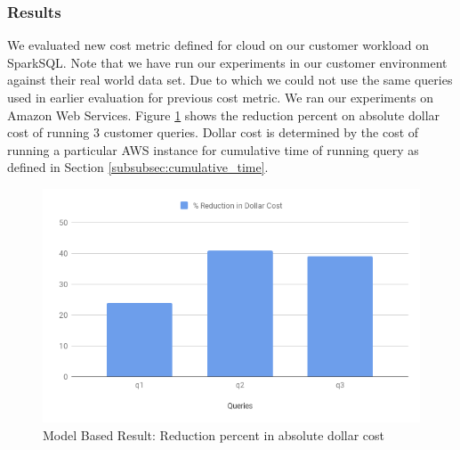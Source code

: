 \noindent\subsubsection*{Results}

We evaluated new cost metric defined for cloud on our customer workload on SparkSQL. Note that we have run our experiments in our customer environment against their real world data set. Due to which we could not use the same queries used in earlier evaluation for previous cost metric. We ran our experiments on Amazon Web Services. Figure \ref{fig:modelbaseddollarresult} shows the reduction percent on absolute dollar cost of running 3 customer queries. Dollar cost is determined by the cost of running a particular AWS instance for cumulative time of running query as defined in Section \ref{subsubsec:cumulative_time}.

\begin{figure}[h]
	\includegraphics[width=\linewidth]{ModelExp.png}
	\caption{Model Based Result: Reduction percent in absolute dollar cost}
	\label{fig:modelbaseddollarresult}
\end{figure}
